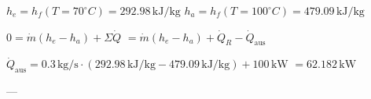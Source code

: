 \( h_e = h_f(T = 70^\circ C) = 292.98 \, \text{kJ/kg} \)  
\( h_a = h_f(T = 100^\circ C) = 479.09 \, \text{kJ/kg} \)  

\( 0 = \dot{m}(h_e - h_a) + \Sigma \dot{Q} \)  
\( = \dot{m}(h_e - h_a) + \dot{Q}_R - \dot{Q}_{\text{aus}} \)  

\( \dot{Q}_{\text{aus}} = 0.3 \, \text{kg/s} \cdot (292.98 \, \text{kJ/kg} - 479.09 \, \text{kJ/kg}) + 100 \, \text{kW} \)  
\( = 62.182 \, \text{kW} \)  

---